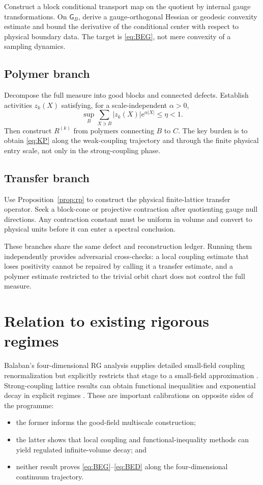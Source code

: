 \documentclass[11pt]{article}
\newcommand{\e}{\mathrm e}
\theoremstyle{remark}
\begin{document}
Construct a block conditional transport map on the quotient by internal gauge
transformations.  On $\mathsf G_B$, derive a gauge-orthogonal Hessian or
geodesic convexity estimate and bound the derivative of the conditional center
with respect to physical boundary data.  The target is \eqref{eq:BEG}, not
mere convexity of a sampling dynamics.

\subsection{Polymer branch}

Decompose the full measure into good blocks and connected defects.  Establish
activities $z_k(X)$ satisfying, for a scale-independent $\alpha>0$,
\begin{equation}\label{eq:KP}
 \sup_B\sum_{X\ni B}|z_k(X)|\e^{\alpha|X|}\le\eta<1.
\end{equation}
Then construct $R^{(k)}$ from polymers connecting $B$ to $C$.  The key burden
is to obtain \eqref{eq:KP} along the weak-coupling trajectory and through the
finite physical entry scale, not only in the strong-coupling phase.

\subsection{Transfer branch}

Use Proposition~\ref{prop:rp} to construct the physical finite-lattice transfer
operator.  Seek a block-cone or projective contraction after quotienting gauge
null directions.  Any contraction constant must be uniform in volume and
convert to physical units before it can enter a spectral conclusion.

These branches share the same defect and reconstruction ledger.  Running them
independently provides adversarial cross-checks: a local coupling estimate that
loses positivity cannot be repaired by calling it a transfer estimate, and a
polymer estimate restricted to the trivial orbit chart does not control the
full measure.

\section{Relation to existing rigorous regimes}

Balaban's four-dimensional RG analysis supplies detailed small-field coupling
renormalization but explicitly restricts that stage to a small-field
approximation \cite{BalabanI}.  Strong-coupling lattice results can obtain
functional inequalities and exponential decay in explicit regimes
\cite{ShenZhuZhu}.  These are important calibrations on opposite sides of the
programme:
\begin{itemize}
\item the former informs the good-field multiscale construction;
\item the latter shows that local coupling and functional-inequality methods
      can yield regulated infinite-volume decay; and
\item neither result proves \eqref{eq:BEG}--\eqref{eq:BED} along the
      four-dimensional continuum trajectory.
\end{itemize}
\end{document}
